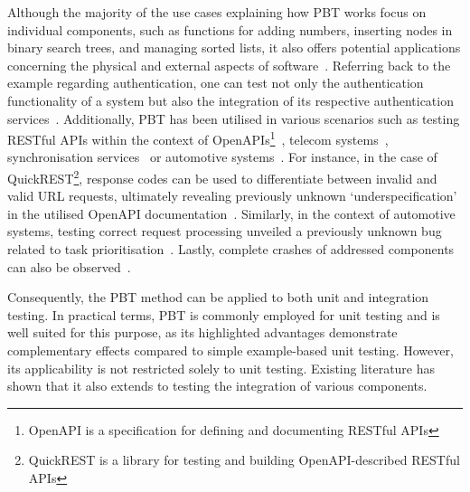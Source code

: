 \documentclass[runningheads]{llncs}
\begin{document}
Although the majority of the use cases explaining how PBT works focus on individual components, such as functions for adding numbers, inserting nodes in binary search trees,
and managing sorted lists, it also offers potential applications concerning the physical and external aspects of software~\cite{Chen2022}. Referring back to the example regarding authentication, one can test not only the authentication functionality of a system but also the integration of its respective authentication services~\cite{Fink1997}. Additionally, PBT has been utilised in various scenarios such as testing RESTful APIs within the context of OpenAPIs\footnote{OpenAPI is a specification for defining and documenting RESTful APIs}~\cite{Karlsson2019}, telecom systems~\cite{Arts2006}, synchronisation services~\cite{Hughes2016} or automotive systems~\cite{Arts2015}. For instance, in the case of QuickREST\footnote{QuickREST is a library for testing and building OpenAPI-described RESTful APIs}, response codes can be used to differentiate between invalid and valid URL requests, ultimately revealing previously unknown `underspecification' in the utilised OpenAPI documentation~\cite{Karlsson2019}. Similarly, in the context of automotive systems, testing correct request processing unveiled a previously unknown bug related to task prioritisation~\cite{Arts2015}. Lastly, complete crashes of addressed components can also be observed~\cite{Arts2006}.

Consequently, the PBT method can be applied to both unit and integration testing. In practical terms, PBT is commonly employed for unit testing and is well suited for this purpose, as its highlighted advantages demonstrate complementary effects compared to simple example-based unit testing. However, its applicability is not restricted solely to unit testing. Existing literature has shown that it also extends to testing the integration of various components.
\end{document}
